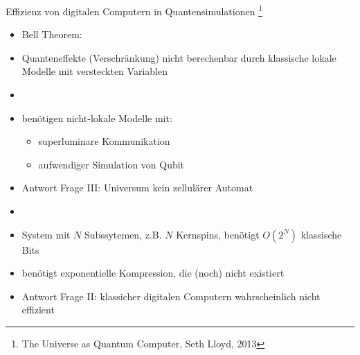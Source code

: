\documentclass[aspectratio=1610, 9pt]{beamer}
\begin{document}
\begin{frame}{Effizienz von digitalen Computern in Quantensimulationen \footnote[8]{The Universe as Quantum Computer, Seth Lloyd, 2013}}
  \begin{itemize}
    \item Bell Theorem:
    \item[] Quanteneffekte (Verschränkung) nicht berechenbar durch klassische lokale Modelle mit versteckten Variablen
    \item[]
    \item benötigen nicht-lokale Modelle mit:
    \begin{itemize}
      \item superluminare Kommunikation
      \item aufwendiger Simulation von Qubit
    \end{itemize}
    \item[\rightarrow] Antwort Frage III: Universum kein zellulärer Automat
    \item[]
    \item System mit $N$ Subssytemen, z.B. $N$ Kernspins, benötigt $O(2^N)$ klassische Bits
    \item benötigt exponentielle Kompression, die (noch) nicht existiert
    \item[\rightarrow] Antwort Frage II: klassicher digitalen Computern wahrscheinlich nicht effizient
  \end{itemize}
\end{frame}
\end{document}
